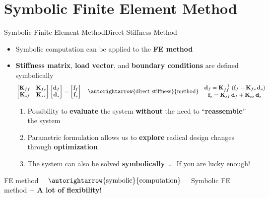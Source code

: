 \section{Symbolic Finite Element Method}

\begin{frame}{Symbolic Finite Element Method}{Direct Stiffness Method}
  \begin{itemize}
    \item Symbolic computation can be applied to the \textbf{\acs{FE} method}
    \item \textbf{Stiffness matrix}, \textbf{load vector}, and \textbf{boundary conditions} are defined symbolically
    \begin{equation*}
      \begin{bmatrix}
        \mathbf{K}_{ff} & \mathbf{K}_{fs} \\
        \mathbf{K}_{sf} & \mathbf{K}_{ss}
      \end{bmatrix} \begin{bmatrix}
        \mathbf{d}_{f} \\
        \mathbf{d}_{s}
      \end{bmatrix} = \begin{bmatrix}
        \mathbf{f}_{f} \\
        \mathbf{f}_{s}
      \end{bmatrix}
      \quad \autorightarrow{\text{direct stiffness}}{\text{method}} \quad
      \begin{matrix}
        \mathbf{d}_{f} = \mathbf{K}_{ff}^{-1}\,\left(\mathbf{f}_{f} - \mathbf{K}_{fs}\,\mathbf{d}_{s}\right) \\
        \mathbf{f}_{s} = \mathbf{K}_{sf}\,\mathbf{d}_{f} + \mathbf{K}_{ss}\,\mathbf{d}_{s}
      \end{matrix}
    \end{equation*}
    \begin{enumerate}
      \item Possibility to \textbf{evaluate} the system \textbf{without} the need to ``\textbf{reassemble}'' the system \\
      \item Parametric formulation allows us to \textbf{explore} radical design changes through \textbf{optimization} \\
      \item The system can also be solved \textbf{symbolically}~\dots~If you are lucky enough!
    \end{enumerate}
  \end{itemize}
  \begin{bbox}
    \centering
    \acs{FE} method $\quad \autorightarrow{\text{symbolic}}{\text{computation}} \quad$ Symbolic \acs{FE} method + \textcolor{fg_sl_color}{\textbf{A lot of flexibility!}}
  \end{bbox}
\end{frame}


